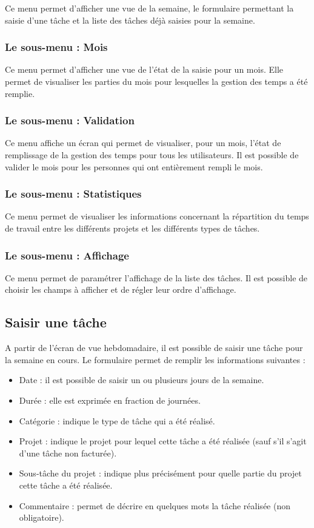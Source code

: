 Ce menu permet d'afficher une vue de la semaine, le formulaire permettant la saisie d'une tâche et la liste des tâches déjà saisies pour la semaine.

\subsubsection{Le sous-menu : Mois}

Ce menu permet d'afficher une vue de l'état de la saisie pour un mois. Elle permet de visualiser les parties du mois pour lesquelles la gestion des temps a été remplie.

\subsubsection{Le sous-menu : Validation}

Ce menu affiche un écran qui permet de visualiser, pour un mois,  l'état de remplissage de la gestion des temps pour tous les utilisateurs. Il est possible de valider le mois pour les personnes qui ont entièrement rempli le mois.

\subsubsection{Le sous-menu : Statistiques}

Ce menu permet de visualiser les informations concernant la répartition du temps de travail entre les différents projets et les différents types de tâches.

\subsubsection{Le sous-menu : Affichage}

Ce menu permet de paramétrer l'affichage de la liste des tâches. Il est possible de choisir les champs à afficher et de régler leur ordre d'affichage.

\subsection{Saisir une tâche}

A partir de l'écran de vue hebdomadaire, il est possible de saisir une tâche pour la semaine en cours.
Le formulaire permet de remplir les informations suivantes :

\begin{itemize}
\item Date : il est possible de saisir un ou plusieurs jours de la semaine.
\item Durée : elle est exprimée en fraction de journées.
\item Catégorie : indique le type de tâche qui a été réalisé.
\item Projet : indique le projet pour lequel cette tâche a été réalisée (sauf s'il s'agit d'une tâche non facturée).
\item Sous-tâche du projet : indique plus précisément pour quelle partie du projet cette tâche a été réalisée.
\item Commentaire : permet de décrire en quelques mots la tâche réalisée (non obligatoire).
\end{itemize}

